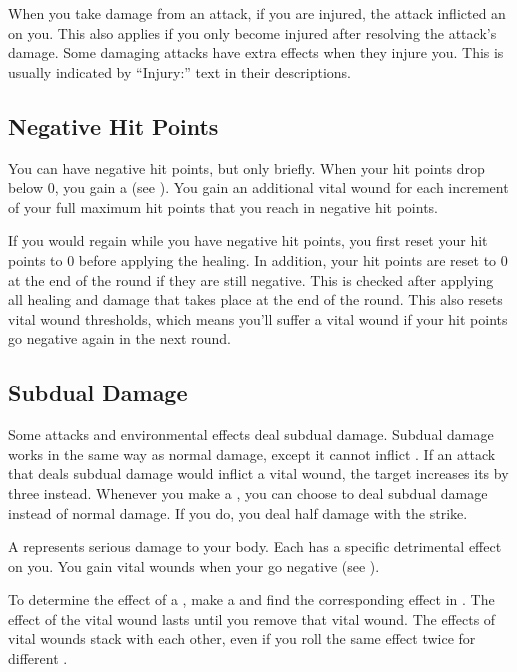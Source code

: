     When you take damage from an attack, if you are injured, the attack inflicted an  on you.
    This also applies if you only become injured after resolving the attack's damage.
    Some damaging attacks have extra effects when they injure you.
    This is usually indicated by ``Injury:'' text in their descriptions.

  \subsection{Negative Hit Points}\label{Negative Hit Points}
    You can have negative hit points, but only briefly.
    When your hit points drop below 0, you gain a  (see ).
    You gain an additional vital wound for each increment of your full maximum hit points that you reach in negative hit points.

    If you would regain  while you have negative hit points, you first reset your hit points to 0 before applying the healing.
    In addition, your hit points are reset to 0 at the end of the round if they are still negative.
    This is checked after applying all healing and damage that takes place at the end of the round.
    This also resets vital wound thresholds, which means you'll suffer a vital wound if your hit points go negative again in the next round.

  \subsection{Subdual Damage}\label{Subdual Damage}
    Some attacks and environmental effects deal subdual damage.
    Subdual damage works in the same way as normal damage, except it cannot inflict .
    If an attack that deals subdual damage would inflict a vital wound, the target increases its  by three instead.
    Whenever you make a , you can choose to deal subdual damage instead of normal damage.
    If you do, you deal half damage with the strike.


  A  represents serious damage to your body.
  Each  has a specific detrimental effect on you.
  You gain vital wounds when your  go negative (see ).

  To determine the effect of a , make a  and find the corresponding effect in .
  The effect of the vital wound lasts until you remove that vital wound.
  The effects of vital wounds stack with each other, even if you roll the same effect twice for different .

